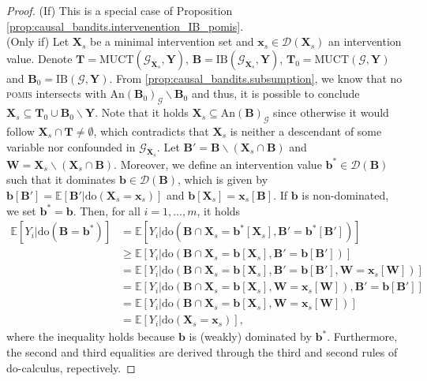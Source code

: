 \begin{proof}
    (If) This is a special case of Proposition \ref{prop:causal_bandits.intervenention_IB_pomis}.
    \vspace{0.2cm}\\
    (Only if) Let $\mathbf{X}_s$ be a minimal intervention set and $\mathbf{x}_s \in \mathcal{D}(\mathbf{X}_s)$ an intervention value. Denote $\mathbf{T}=\text{MUCT}(\mathcal{G}_{\overline{\mathbf{X}}_s},\mathbf{Y})$, $\mathbf{B}=\text{IB}(\mathcal{G}_{\overline{\mathbf{X}}_s},\mathbf{Y})$, $\mathbf{T}_0=\text{MUCT}(\mathcal{G},\mathbf{Y})$ and $\mathbf{B}_0=\text{IB}(\mathcal{G},\mathbf{Y})$. From \autoref{prop:causal_bandits.subsumption}, we know that no \textsc{pomis} intersects with $\text{An}(\mathbf{B}_0)_{\mathcal{G}} \backslash \mathbf{B}_0$ and thus, it is possible to conclude $\mathbf{X}_s \subseteq \mathbf{T}_0 \cup \mathbf{B}_0 \backslash \mathbf{Y}$. Note that it holds $\mathbf{X}_s \subseteq \text{An}(\mathbf{B})_{\mathcal{G}}$ since otherwise it would follow $\mathbf{X}_s \cap \mathbf{T} \neq \emptyset$, which contradicts that $\mathbf{X}_s$ is neither a descendant of some variable nor confounded in $\mathcal{G}_{\overline{\mathbf{X}}_s}$. Let $\mathbf{B}' = \mathbf{B} \backslash (\mathbf{X}_s \cap \mathbf{B})$ and $\mathbf{W} = \mathbf{X}_s \backslash (\mathbf{X}_s \cap \mathbf{B})$. Moreover, we define an intervention value $\mathbf{b}^* \in \mathcal{D}(\mathbf{B})$ such that it dominates $\mathbf{b} \in \mathcal{D}(\mathbf{B})$, which is given by $\mathbf{b}[\mathbf{B}'] = \mathbb{E}[\mathbf{B}' | \text{do}(\mathbf{X}_s= \mathbf{x}_s)]$ and $\mathbf{b}[\mathbf{X}_s] = \textbf{x}_s[\mathbf{B}]$. If $\mathbf{b}$ is non-dominated, we set $\mathbf{b}^*=\mathbf{b}$. Then, for all $i=1,\dots,m$, it holds
    \begin{align}
        \mathbb{E}[Y_i | \text{do}(\mathbf{B}=\mathbf{b}^*)] &=  \mathbb{E}[Y_i | \text{do}(\mathbf{B} \cap \mathbf{X}_s = \mathbf{b}^*[\mathbf{X}_s], \mathbf{B}' = \mathbf{b}^*[\mathbf{B}'])]  \\
        &\geq  \mathbb{E}[Y_i | \text{do}(\mathbf{B} \cap \mathbf{X}_s = \mathbf{b}[\mathbf{X}_s], \mathbf{B}' = \mathbf{b}[\mathbf{B}'])] \\
        &=  \mathbb{E}[Y_i | \text{do}(\mathbf{B} \cap \mathbf{X}_s = \mathbf{b}[\mathbf{X}_s], \mathbf{B}' = \mathbf{b}[\mathbf{B}'], \mathbf{W}=\mathbf{x}_s[\mathbf{W}])] \\
        &=  \mathbb{E}[Y_i | \text{do}(\mathbf{B} \cap \mathbf{X}_s = \mathbf{b}[\mathbf{X}_s], \mathbf{W}=\mathbf{x}_s[\mathbf{W}]), \mathbf{B}' = \mathbf{b}[\mathbf{B}']]\\
        &=  \mathbb{E}[Y_i | \text{do}(\mathbf{B} \cap \mathbf{X}_s = \mathbf{b}[\mathbf{X}_s], \mathbf{W}=\mathbf{x}_s[\mathbf{W}])]\\
        &= \mathbb{E}[Y_i | \text{do}(\mathbf{X}_s = \mathbf{x}_s)],
    \end{align}
    where the inequality holds because $\mathbf{b}$ is (weakly) dominated by $\mathbf{b}^*$. Furthermore, the second and third equalities are derived through the third and second rules of do-calculus, repectively.
\end{proof}

